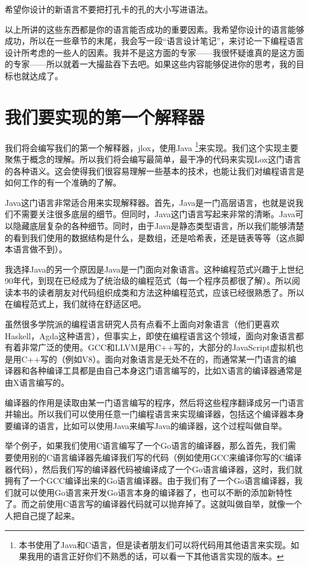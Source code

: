 \documentclass[cn,10pt,math=newtx,citestyle=gb7714-2015,bibstyle=gb7714-2015]{elegantbook}
\begin{document}
\begin{tcolorbox}
希望你设计的新语言不要把打孔卡的孔的大小写进语法。
\end{tcolorbox}

以上所讲的这些东西都是你的语言能否成功的重要因素。我希望你设计的语言能够成功，所以在一些章节的末尾，我会写一段“语言设计笔记”，来讨论一下编程语言设计所考虑的一些人的因素。我并不是这方面的专家——我很怀疑谁真的是这方面的专家——所以就着一大撮盐吞下去吧。如果这些内容能够促进你的思考，我的目标也就达成了。

\section{我们要实现的第一个解释器}

我们将会编写我们的第一个解释器，jlox，使用Java \footnote{本书使用了Java和C语言，但是读者朋友们可以将代码用其他语言来实现。如果我用的语言正好你们不熟悉的话，可以看一下其他语言实现的版本。}来实现。我们这个实现主要聚焦于概念的理解。所以我们将会编写最简单，最干净的代码来实现Lox这门语言的各种语义。这会使得我们很容易理解一些基本的技术，也能让我们对编程语言是如何工作的有一个准确的了解。

Java这门语言非常适合用来实现解释器。首先，Java是一门高层语言，也就是说我们不需要关注很多底层的细节。但同时，Java这门语言写起来非常的清晰。Java可以隐藏底层复杂的各种细节。同时，由于Java是静态类型语言，所以我们能够清楚的看到我们使用的数据结构是什么，是数组，还是哈希表，还是链表等等（这点脚本语言做不到）。

我选择Java的另一个原因是Java是一门面向对象语言。这种编程范式兴趣于上世纪90年代，到现在已经成为了统治级的编程范式（每一个程序员都很了解）。所以阅读本书的读者朋友对代码组织成类和方法这种编程范式，应该已经很熟悉了。所以在编程范式上，我们就待在舒适区吧。

虽然很多学院派的编程语言研究人员有点看不上面向对象语言（他们更喜欢Haskell，Agda这种语言），但事实上，即使在编程语言这个领域，面向对象语言都有着非常广泛的使用。GCC和LLVM是用C++写的，大部分的JavaScript虚拟机也是用C++写的（例如V8）。面向对象语言是无处不在的，而通常某一门语言的编译器和各种编译工具都是由自己本身这门语言编写的，比如X语言的编译器通常是由X语言编写的。

\begin{tcolorbox}
编译器的作用是读取由某一门语言编写的程序，然后将这些程序翻译成另一门语言并输出。所以我们可以使用任意一门编程语言来实现编译器，包括这个编译器本身要编译的语言，比如可以使用Java来编写Java的编译器，这个过程叫做自举。

举个例子，如果我们使用C语言编写了一个Go语言的编译器，那么首先，我们需要使用别的C语言编译器先编译我们写的代码（例如使用GCC来编译你写的C编译器代码），然后我们写的编译器代码被编译成了一个Go语言编译器，这时，我们就拥有了一个GCC编译出来的Go语言编译器。由于我们有了一个Go语言编译器，我们就可以使用Go语言来开发Go语言本身的编译器了，也可以不断的添加新特性了。而之前使用C语言写的编译器代码就可以抛弃掉了。这就叫做自举，就像一个人把自己提了起来。
\end{tcolorbox}
\end{document}

